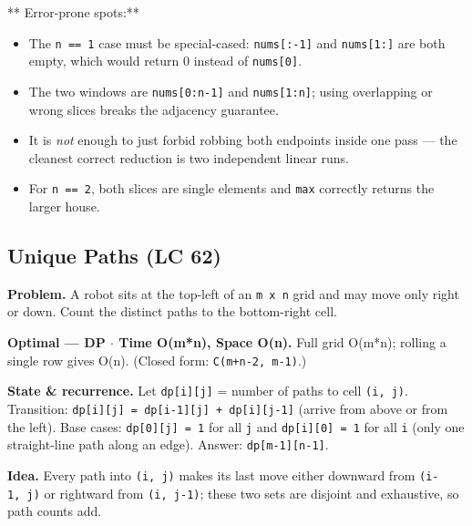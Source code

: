 \documentclass[11pt]{article}
\providecommand{\tightlist}{\setlength{\itemsep}{1pt}\setlength{\parskip}{0pt}}
\begin{document}
** Error-prone spots:**

\begin{itemize}
\tightlist
\item
  The \texttt{n\ ==\ 1} case must be special-cased: \texttt{nums{[}:-1{]}} and \texttt{nums{[}1:{]}} are both empty, which would return 0 instead of \texttt{nums{[}0{]}}.
\item
  The two windows are \texttt{nums{[}0:n-1{]}} and \texttt{nums{[}1:n{]}}; using overlapping or wrong slices breaks the adjacency guarantee.
\item
  It is \emph{not} enough to just forbid robbing both endpoints inside one pass --- the cleanest correct reduction is two independent linear runs.
\item
  For \texttt{n\ ==\ 2}, both slices are single elements and \texttt{max} correctly returns the larger house.
\end{itemize}

\subsection{Unique Paths (LC 62)}\label{unique-paths-lc-62}

\textbf{Problem.} A robot sits at the top-left of an \texttt{m\ x\ n} grid and may move only right or down. Count the distinct paths to the bottom-right cell.

\textbf{Optimal --- DP \(\cdot\) Time O(m*n), Space O(n).} Full grid O(m*n); rolling a single row gives O(n). (Closed form: \texttt{C(m+n-2,\ m-1)}.)

\textbf{State \& recurrence.} Let \texttt{dp{[}i{]}{[}j{]}} = number of paths to cell \texttt{(i,\ j)}. Transition: \texttt{dp{[}i{]}{[}j{]}\ =\ dp{[}i-1{]}{[}j{]}\ +\ dp{[}i{]}{[}j-1{]}} (arrive from above or from the left). Base cases: \texttt{dp{[}0{]}{[}j{]}\ =\ 1} for all \texttt{j} and \texttt{dp{[}i{]}{[}0{]}\ =\ 1} for all \texttt{i} (only one straight-line path along an edge). Answer: \texttt{dp{[}m-1{]}{[}n-1{]}}.

\textbf{Idea.} Every path into \texttt{(i,\ j)} makes its last move either downward from \texttt{(i-1,\ j)} or rightward from \texttt{(i,\ j-1)}; these two sets are disjoint and exhaustive, so path counts add.

\end{document}
